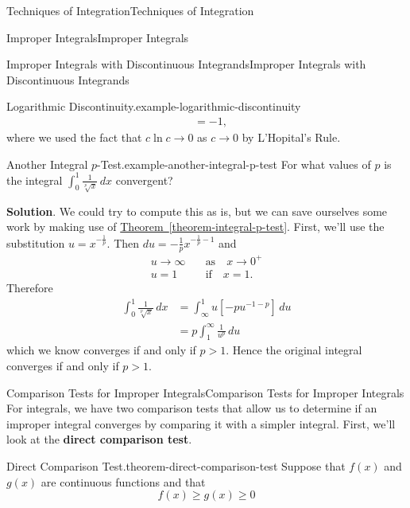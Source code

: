 \documentclass[10pt,]{book}
\newcommand{\terminology}[1]{\textbf{#1}}
\numberwithin{equation}{section}
\newcommand{\gt}{>}
\begin{document}
\begin{chapterptx}{Techniques of Integration}{}{Techniques of Integration}{}{}
\begin{sectionptx}{Improper Integrals}{}{Improper Integrals}{}{}
\begin{subsectionptx}{Improper Integrals with Discontinuous Integrands}{}{Improper Integrals with Discontinuous Integrands}{}{}
\begin{example}{Logarithmic Discontinuity.}{example-logarithmic-discontinuity}
\begin{align*}
& = -1, 
\end{align*}
where we used the fact that \(c\ln c\to 0\) as \(c\to0\) by L'Hopital's Rule.%
\end{example}
\begin{example}{Another Integral \(p\)-Test.}{example-another-integral-p-test}%
\hypertarget{p-600}{}%
For what values of \(p\) is the integral \(\int_{0}^{1}\frac{1}{\sqrt[p]{x}}\,dx\) convergent?%
\par\smallskip%
\noindent\textbf{Solution}.\hypertarget{solution-130}{}\quad%
\hypertarget{p-601}{}%
We could try to compute this as is, but we can save ourselves some work by making use of \hyperref[theorem-integral-p-test]{Theorem~\ref{theorem-integral-p-test}}. First, we'll use the substitution \(u = x^{-\frac{1}{p}}\). Then \(du = -\frac{1}{p}x^{-\frac{1}{p} - 1}\) and%
\begin{align*}
u\to\infty & \quad\text{as}\quad x\to0^{+}\\
u = 1 & \quad\text{if}\quad x = 1.
\end{align*}
Therefore%
\begin{align*}
\int_{0}^{1}\frac{1}{\sqrt[p]{x}}\,dx &= \int_{\infty}^{1}u\left[-pu^{-1 - p}\right]\,du\\
& = p\int_{1}^{\infty}\frac{1}{u^{p}}\,du
\end{align*}
which we know converges if and only if \(p \gt 1\). Hence the original integral converges if and only if \(p\gt1\).%
\end{example}
\end{subsectionptx}
%
%
\typeout{************************************************}
\typeout{************************************************}
%
\begin{subsectionptx}{Comparison Tests for Improper Integrals}{}{Comparison Tests for Improper Integrals}{}{}\label{subsection-comparison-tests-for-improper-integrals}
\hypertarget{p-602}{}%
For integrals, we have two comparison tests that allow us to determine if an improper integral converges by comparing it with a simpler integral. First, we'll look at the \terminology{direct comparison test}.%
\begin{theorem}{Direct Comparison Test.}{}{theorem-direct-comparison-test}%
\hypertarget{p-603}{}%
Suppose that \(f(x)\) and \(g(x)\) are continuous functions and that%
\begin{equation*}
f(x) \geq g(x) \geq 0
\end{equation*}

\end{theorem}
\end{subsectionptx}
\end{sectionptx}
\end{chapterptx}
\end{document}

